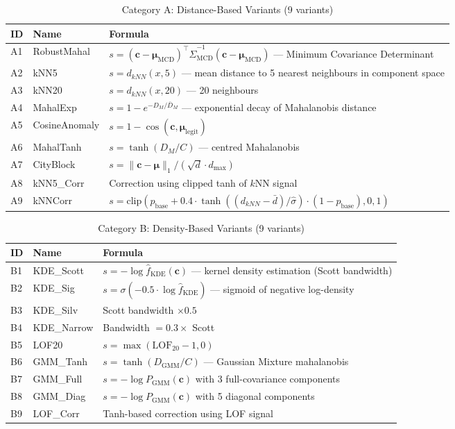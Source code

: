 \documentclass[journal]{IEEEtran}
\begin{document}
\begin{table}[!t]
\centering
\caption{Category A: Distance-Based Variants (9 variants)}
\label{tab:cat_a}
\begin{tabular}{@{}llp{11cm}@{}}
\toprule
\textbf{ID} & \textbf{Name} & \textbf{Formula} \\
\midrule
A1 & RobustMahal       & $s = (\mathbf{c}-\boldsymbol{\mu}_{\text{MCD}})^\top \hat{\Sigma}_{\text{MCD}}^{-1}(\mathbf{c}-\boldsymbol{\mu}_{\text{MCD}})$ --- Minimum Covariance Determinant \\
A2 & kNN5              & $s = d_{kNN}(x, 5)$ --- mean distance to 5 nearest neighbours in component space \\
A3 & kNN20             & $s = d_{kNN}(x, 20)$ --- 20 neighbours \\
A4 & MahalExp          & $s = 1 - e^{-D_M/\bar{D}_M}$ --- exponential decay of Mahalanobis distance \\
A5 & CosineAnomaly     & $s = 1 - \cos(\mathbf{c}, \boldsymbol{\mu}_{\text{legit}})$ \\
A6 & MahalTanh         & $s = \tanh(D_M / C)$ --- centred Mahalanobis \\
A7 & CityBlock         & $s = \|\mathbf{c}-\boldsymbol{\mu}\|_1/(\sqrt{d}\cdot d_{\max})$ \\
A8 & kNN5\_Corr        & Correction using clipped tanh of $k$NN signal \\
A9 & kNNCorr           & $s = \text{clip}(p_{\text{base}} + 0.4 \cdot \tanh((d_{kNN}-\bar{d})/\hat{\sigma}) \cdot (1-p_{\text{base}}), 0, 1)$ \\
\bottomrule
\end{tabular}
\end{table}

\begin{table}[!t]
\centering
\caption{Category B: Density-Based Variants (9 variants)}
\label{tab:cat_b}
\begin{tabular}{@{}llp{11cm}@{}}
\toprule
\textbf{ID} & \textbf{Name} & \textbf{Formula} \\
\midrule
B1 & KDE\_Scott    & $s = -\log \hat{f}_{\text{KDE}}(\mathbf{c})$ --- kernel density estimation (Scott bandwidth) \\
B2 & KDE\_Sig      & $s = \sigma(-0.5 \cdot \log \hat{f}_{\text{KDE}})$ --- sigmoid of negative log-density \\
B3 & KDE\_Silv     & Scott bandwidth $\times 0.5$ \\
B4 & KDE\_Narrow   & Bandwidth $= 0.3 \times$ Scott \\
B5 & LOF20         & $s = \max(\text{LOF}_{20}-1, 0)$ \\
B6 & GMM\_Tanh     & $s = \tanh(D_{\text{GMM}} / C)$ --- Gaussian Mixture mahalanobis \\
B7 & GMM\_Full     & $s = -\log P_{\text{GMM}}(\mathbf{c})$ with 3 full-covariance components \\
B8 & GMM\_Diag     & $s = -\log P_{\text{GMM}}(\mathbf{c})$ with 5 diagonal components \\
B9 & LOF\_Corr     & Tanh-based correction using LOF signal \\
\bottomrule
\end{tabular}
\end{table}
\end{document}
